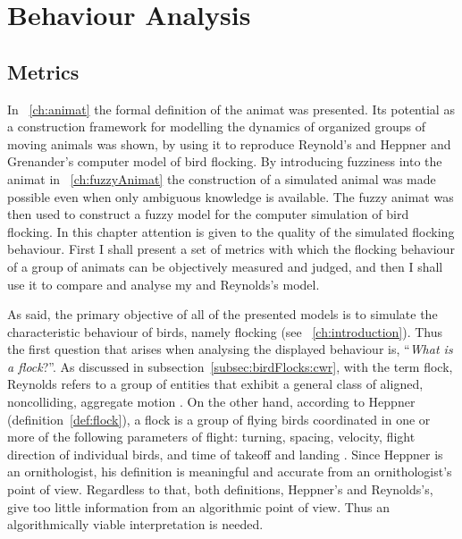 









\chapter{Behaviour Analysis}
\label{ch:analysis}


\section{Metrics}
\label{sec:analysis:metrics}
In \chaptername~\ref{ch:animat} the formal definition of the animat was presented. Its potential as a construction framework for modelling the dynamics of organized groups of moving animals was shown, by using it to reproduce Reynold's \cite{reynolds:1987,reynolds:1999} and Heppner and Grenander's \cite{heppner:1990} computer model of bird flocking. By introducing fuzziness into the animat in \chaptername~\ref{ch:fuzzyAnimat} the construction of a simulated animal was made possible even when only ambiguous knowledge is available. The fuzzy animat was then used to construct a fuzzy model for the computer simulation of bird flocking. In this chapter attention is given to the quality of the simulated flocking behaviour. First I shall present a set of metrics with which the flocking behaviour of a group of animats can be objectively measured and judged, and then I shall use it to compare and analyse my and Reynolds's model. 

As said, the primary objective of all of the presented models is to simulate the characteristic behaviour of birds, namely flocking (see \chaptername~\ref{ch:introduction}). Thus the first question that arises when analysing the displayed behaviour is, ``\emph{What is a flock}?''. As discussed in subsection~\ref{subsec:birdFlocks:cwr}, with the term flock, Reynolds refers to a group of entities that exhibit a general class of aligned, noncolliding, aggregate motion \cite{reynolds:1987}. On the other hand, according to Heppner (definition~\ref{def:flock}), a flock is a group of flying birds coordinated in one or more of the following parameters of flight: turning, spacing, velocity, flight direction of individual birds, and time of takeoff and landing \cite{heppner:1974a}. Since Heppner is an ornithologist, his definition is meaningful and accurate from an ornithologist's point of view. Regardless to that, both definitions, Heppner's and Reynolds's, give too little information from an algorithmic point of view. Thus an algorithmically viable interpretation is needed.

